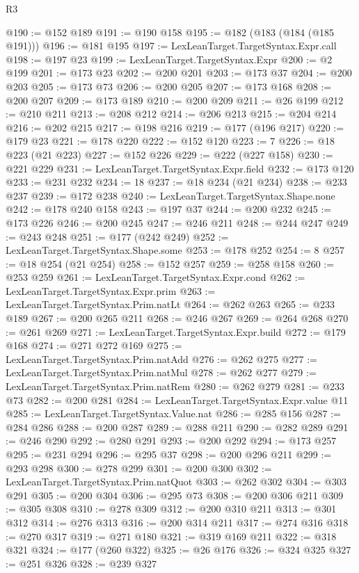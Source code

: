 \begin{lexlean}{R3}
\begin{coremodule}
@190 := @152 @189
@191 := @190 @158
@195 := @182 (@183 (@184 (@185 @191)))
@196 := @181 @195
@197 := LexLeanTarget.TargetSyntax.Expr.call
@198 := @197 @23
@199 := LexLeanTarget.TargetSyntax.Expr
@200 := @2 @199
@201 := @173 @23
@202 := @200 @201
@203 := @173 @37
@204 := @200 @203
@205 := @173 @73
@206 := @200 @205
@207 := @173 @168
@208 := @200 @207
@209 := @173 @189
@210 := @200 @209
@211 := @26 @199
@212 := @210 @211
@213 := @208 @212
@214 := @206 @213
@215 := @204 @214
@216 := @202 @215
@217 := @198 @216
@219 := @177 (@196 @217)
@220 := @179 @23
@221 := @178 @220
@222 := @152 @120
@223 := 7
@226 := @18 @223 (@21 @223)
@227 := @152 @226
@229 := @222 (@227 @158)
@230 := @221 @229
@231 := LexLeanTarget.TargetSyntax.Expr.field
@232 := @173 @120
@233 := @231 @232
@234 := 18
@237 := @18 @234 (@21 @234)
@238 := @233 @237
@239 := @172 @238
@240 := LexLeanTarget.TargetSyntax.Shape.none
@242 := @178 @240 @158
@243 := @197 @37
@244 := @200 @232
@245 := @173 @226
@246 := @200 @245
@247 := @246 @211
@248 := @244 @247
@249 := @243 @248
@251 := @177 (@242 @249)
@252 := LexLeanTarget.TargetSyntax.Shape.some
@253 := @178 @252
@254 := 8
@257 := @18 @254 (@21 @254)
@258 := @152 @257
@259 := @258 @158
@260 := @253 @259
@261 := LexLeanTarget.TargetSyntax.Expr.cond
@262 := LexLeanTarget.TargetSyntax.Expr.prim
@263 := LexLeanTarget.TargetSyntax.Prim.natLt
@264 := @262 @263
@265 := @233 @189
@267 := @200 @265 @211
@268 := @246 @267
@269 := @264 @268
@270 := @261 @269
@271 := LexLeanTarget.TargetSyntax.Expr.build
@272 := @179 @168
@274 := @271 @272 @169
@275 := LexLeanTarget.TargetSyntax.Prim.natAdd
@276 := @262 @275
@277 := LexLeanTarget.TargetSyntax.Prim.natMul
@278 := @262 @277
@279 := LexLeanTarget.TargetSyntax.Prim.natRem
@280 := @262 @279
@281 := @233 @73
@282 := @200 @281
@284 := LexLeanTarget.TargetSyntax.Expr.value @11
@285 := LexLeanTarget.TargetSyntax.Value.nat
@286 := @285 @156
@287 := @284 @286
@288 := @200 @287
@289 := @288 @211
@290 := @282 @289
@291 := @246 @290
@292 := @280 @291
@293 := @200 @292
@294 := @173 @257
@295 := @231 @294
@296 := @295 @37
@298 := @200 @296 @211
@299 := @293 @298
@300 := @278 @299
@301 := @200 @300
@302 := LexLeanTarget.TargetSyntax.Prim.natQuot
@303 := @262 @302
@304 := @303 @291
@305 := @200 @304
@306 := @295 @73
@308 := @200 @306 @211
@309 := @305 @308
@310 := @278 @309
@312 := @200 @310 @211
@313 := @301 @312
@314 := @276 @313
@316 := @200 @314 @211
@317 := @274 @316
@318 := @270 @317
@319 := @271 @180
@321 := @319 @169 @211
@322 := @318 @321
@324 := @177 (@260 @322)
@325 := @26 @176
@326 := @324 @325
@327 := @251 @326
@328 := @239 @327

\end{coremodule}
\end{lexlean}
